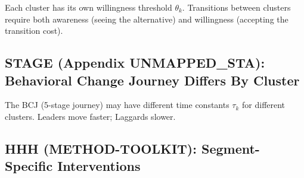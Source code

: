 Each cluster has its own willingness threshold $\theta_k$. Transitions between
clusters require both awareness (seeing the alternative) and willingness
(accepting the transition cost).

\subsection{STAGE (Appendix UNMAPPED_STA): Behavioral Change Journey Differs By Cluster}

The BCJ (5-stage journey) may have different time constants $\tau_k$ for
different clusters. Leaders move faster; Laggards slower.

\subsection{HHH (METHOD-TOOLKIT): Segment-Specific Interventions}
\label{sec:ba-hhh-integration}


